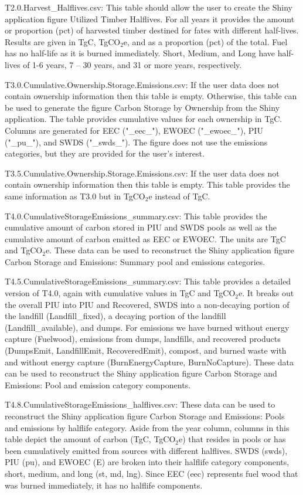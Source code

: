 \documentclass[
]{book}
\begin{document}
T2.0.Harvest\_Halflives.csv: This table should allow the user to create the Shiny application figure Utilized Timber Halflives. For all years it provides the amount or proportion (pct) of harvested timber destined for fates with different half-lives. Results are given in TgC, TgCO\(_2\)e, and as a proportion (pct) of the total. Fuel has no half-life as it is burned immediately. Short, Medium, and Long have half-lives of 1-6 years, 7 -- 30 years, and 31 or more years, respectively.

T3.0.Cumulative.Ownership.Storage.Emissions.csv: If the user data does not contain ownership information then this table is empty. Otherwise, this table can be used to generate the figure Carbon Storage by Ownership from the Shiny application. The table provides cumulative values for each ownership in TgC. Columns are generated for EEC ("\_eec\_"), EWOEC ("\_ewoec\_"), PIU ("\_pu\_"), and SWDS ("\_swds\_"). The figure does not use the emissions categories, but they are provided for the user's interest.

T3.5.Cumulative.Ownership.Storage.Emissions.csv: If the user data does not contain ownership information then this table is empty. This table provides the same information as T3.0 but in TgCO\(_2\)e instead of TgC.

T4.0.CumulativeStorageEmissions\_summary.csv: This table provides the cumulative amount of carbon stored in PIU and SWDS pools as well as the cumulative amount of carbon emitted as EEC or EWOEC. The units are TgC and TgCO\(_2\)e. These data can be used to reconstruct the Shiny application figure Carbon Storage and Emissions: Summary pool and emissions categories.

T4.5.CumulativeStorageEmissions\_summary.csv: This table provides a detailed version of T4.0, again with cumulative values in TgC and TgCO\(_2\)e. It breaks out the overall PIU into PIU and Recovered, SWDS into a non-decaying portion of the landfill (Landfill\_fixed), a decaying portion of the landfill (Landfill\_available), and dumps. For emissions we have burned without energy capture (Fuelwood), emissions from dumps, landfills, and recovered products (DumpsEmit, LandfillEmit, RecoveredEmit), compost, and burned waste with and without energy capture (BurnEnergyCapture, BurnNoCapture). These data can be used to reconstruct the Shiny application figure Carbon Storage and Emissions: Pool and emission category components.

T4.8.CumulativeStorageEmissions\_halflives.csv: These data can be used to reconstruct the Shiny application figure Carbon Storage and Emissions: Pools and emissions by halflife category. Aside from the year column, columns in this table depict the amount of carbon (TgC, TgCO\(_2\)e) that resides in pools or has been cumulatively emitted from sources with different halflives. SWDS (swds), PIU (pu), and EWOEC (E) are broken into their halflife category components, short, medium, and long (st, md, lng). Since EEC (eec) represents fuel wood that was burned immediately, it has no halflife components.
\end{document}

